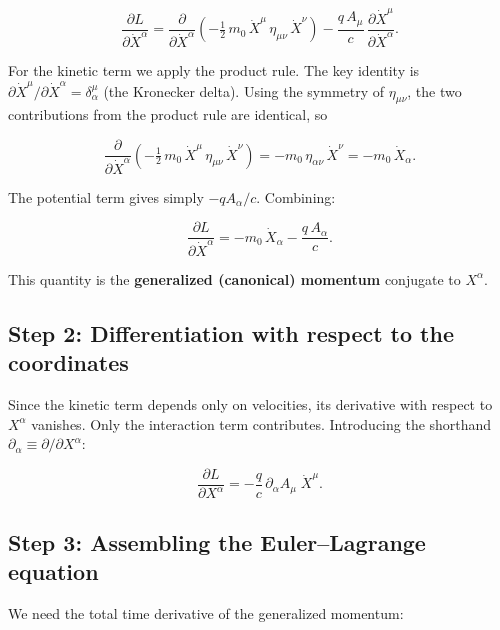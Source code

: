 \begin{equation}
\frac{\partial L}{\partial \dot{X}^\alpha}
= \frac{\partial}{\partial \dot{X}^\alpha}\!\left(-\tfrac{1}{2}\,m_0\,\dot{X}^\mu\,\eta_{\mu\nu}\,\dot{X}^\nu\right)
- \frac{q\,A_\mu}{c}\,\frac{\partial \dot{X}^\mu}{\partial \dot{X}^\alpha}.
\end{equation}

For the kinetic term we apply the product rule. The key identity is $\partial \dot{X}^\mu / \partial \dot{X}^\alpha = \delta^\mu_\alpha$ (the Kronecker delta). Using the symmetry of $\eta_{\mu\nu}$, the two contributions from the product rule are identical, so

\begin{equation}
\frac{\partial}{\partial \dot{X}^\alpha}\!\left(-\tfrac{1}{2}\,m_0\,\dot{X}^\mu\,\eta_{\mu\nu}\,\dot{X}^\nu\right)
= -m_0\,\eta_{\alpha\nu}\,\dot{X}^\nu = -m_0\,\dot{X}_\alpha.
\end{equation}

The potential term gives simply $-qA_\alpha/c$. Combining:

\begin{equation}
\boxed{\frac{\partial L}{\partial \dot{X}^\alpha} = -m_0\,\dot{X}_\alpha - \frac{q\,A_\alpha}{c}.}
\end{equation}

This quantity is the \textbf{generalized (canonical) momentum} conjugate to $X^\alpha$.

\subsection*{Step 2: Differentiation with respect to the coordinates}

Since the kinetic term depends only on velocities, its derivative with respect to $X^\alpha$ vanishes. Only the interaction term contributes. Introducing the shorthand $\partial_\alpha \equiv \partial / \partial X^\alpha$:

\begin{equation}
\frac{\partial L}{\partial X^\alpha} = -\frac{q}{c}\,\partial_\alpha A_\mu\;\dot{X}^\mu.
\end{equation}

\subsection*{Step 3: Assembling the Euler--Lagrange equation}

We need the total time derivative of the generalized momentum:

